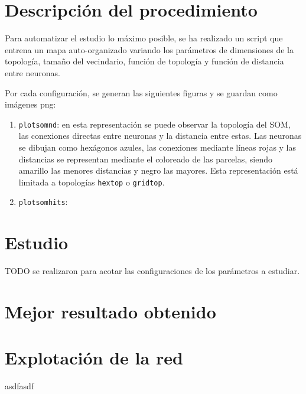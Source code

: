 \documentclass[a4paper,12pt,titlepage]{article}
\begin{document}
\section{Descripción del procedimiento}

Para automatizar el estudio lo máximo posible, se ha realizado un script que entrena un mapa auto-organizado variando los parámetros de dimensiones de la topología, tamaño del vecindario, función de topología y función de distancia entre neuronas. 

Por cada configuración, se generan las siguientes figuras y se guardan como imágenes png:

\begin{enumerate}[noitemsep]
	\item \lstinline|plotsomnd|: en esta representación se puede observar la topología del SOM, las conexiones directas entre neuronas y la distancia entre estas. Las neuronas se dibujan como hexágonos azules, las conexiones mediante líneas rojas y las distancias se representan mediante el coloreado de las parcelas, siendo amarillo las menores distancias y negro las mayores. Esta representación está limitada a topologías \lstinline|hextop| o \lstinline|gridtop|. \citep{matlab:plotsomnd}
	\item \lstinline|plotsomhits|:  
\end{enumerate}



\section{Estudio}

TODO se realizaron para acotar las configuraciones de los parámetros a estudiar.

\section{Mejor resultado obtenido}


\section{Explotación de la red}

asdfasdf



\newpage


\end{document}
